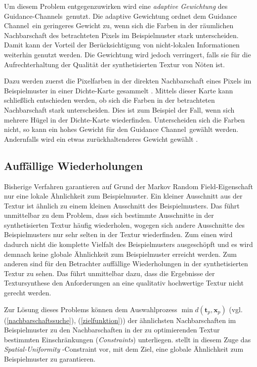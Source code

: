 Um diesem Problem entgegenzuwirken wird eine \emph{adaptive Gewichtung} des \glqq Gui\-dance-Channels\grqq \ genutzt.
Die adaptive Gewichtung ordnet dem \glqq Guidance Channel\grqq \ ein geringeres Gewicht zu, wenn sich die Farben in der räumlichen Nachbarschaft des betrachteten Pixels im Beispielmuster stark unterscheiden.
Damit kann der Vorteil der Berücksichtigung von nicht-lokalen Informationen weiterhin genutzt werden.
Die Gewichtung wird jedoch verringert, falls sie für die Aufrechterhaltung der Qualität der synthetisierten Textur von Nöten ist.

Dazu werden zuerst die Pixelfarben in der direkten Nachbarschaft eines Pixels im Beispielmuster in einer Dichte-Karte gesammelt \cite{SelfTuning}.
Mittels dieser Karte kann schließlich entschieden werden, ob sich die Farben in der betrachteten Nachbarschaft stark unterscheiden.
Dies ist zum Beispiel der Fall, wenn sich mehrere Hügel in der Dichte-Karte wiederfinden.
Unterscheiden sich die Farben nicht, so kann ein hohes Gewicht für den \glqq Guidance Channel\grqq \ gewählt werden.
Andernfalls wird ein etwas zurückhaltenderes Gewicht gewählt \cite{SelfTuning}.

\subsection{Auffällige Wiederholungen}

Bisherige Verfahren garantieren auf Grund der \glqq Markov Random Field\grqq -Eigenschaft nur eine lokale Ähnlichkeit zum Beispielmuster.
Ein kleiner Ausschnitt aus der Textur ist ähnlich zu einem kleinen Ausschnitt des Beispielmusters.
Das führt unmittelbar zu dem Problem, dass sich bestimmte Ausschnitte in der synthetisierten Textur häufig wiederholen, wogegen sich andere Ausschnitte des Beispielmusters nur sehr selten in der Textur wiederfinden.
Zum einen wird dadurch nicht die komplette Vielfalt des Beispielmusters ausgeschöpft und es wird demnach keine globale Ähnlichkeit zum Beispielmuster erreicht werden.
Zum anderen sind für den Betrachter auffällige Wiederholungen in der synthetisierten Textur zu sehen.
Das führt unmittelbar dazu, dass die Ergebnisse der Textursynthese den Anforderungen an eine qualitativ hochwertige Textur nicht gerecht werden.

Zur Lösung dieses Problems können dem Auswahlprozess $\min d(\textbf{t}_p, \textbf{x}_p)$ (vgl. (\ref{nachbarschaftssuche}), (\ref{zielfunktion})) der ähnlichsten Nachbarschaften im Beispielmuster zu den Nachbarschaften in der zu optimierenden Textur bestimmten Einschränkungen (\emph{Constraints}) unterliegen.
\cite{SelfTuning} stellt in diesem Zuge das \emph{\glqq Spatial-Uniformity\grqq} -Constraint vor, mit dem Ziel, eine globale Ähnlichkeit zum Beispielmuster zu garantieren.

